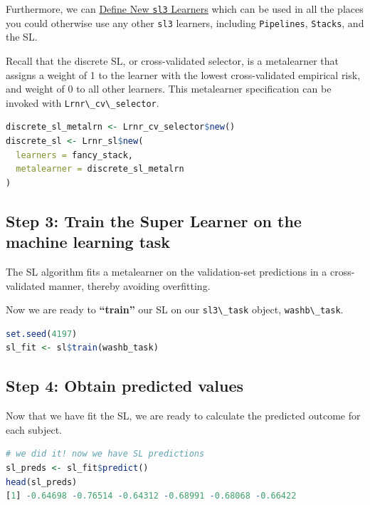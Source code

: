 \documentclass[12pt, krantz2,]{krantz}
\newcommand{\passthrough}[1]{#1}
\theoremstyle{definition}
\theoremstyle{definition}
\theoremstyle{definition}
\newcommand{\1}{\mathbbm{1}}
\begin{document}
Furthermore, we can \href{https://tlverse.org/sl3/articles/custom_lrnrs.html}{Define New \passthrough{\lstinline!sl3!}
Learners} which can be used
in all the places you could otherwise use any other \passthrough{\lstinline!sl3!} learners, including
\passthrough{\lstinline!Pipelines!}, \passthrough{\lstinline!Stacks!}, and the SL.

Recall that the discrete SL, or cross-validated selector, is a metalearner that
assigns a weight of 1 to the learner with the lowest cross-validated empirical
risk, and weight of 0 to all other learners. This metalearner specification can
be invoked with \passthrough{\lstinline!Lrnr\_cv\_selector!}.

\begin{lstlisting}[language=R]
discrete_sl_metalrn <- Lrnr_cv_selector$new()
discrete_sl <- Lrnr_sl$new(
  learners = fancy_stack,
  metalearner = discrete_sl_metalrn
)
\end{lstlisting}

\hypertarget{step-3-train-the-super-learner-on-the-machine-learning-task}{%
\subsection{Step 3: Train the Super Learner on the machine learning task}\label{step-3-train-the-super-learner-on-the-machine-learning-task}}

The SL algorithm fits a metalearner on the validation-set predictions in a
cross-validated manner, thereby avoiding overfitting.

Now we are ready to \textbf{``train''} our SL on our \passthrough{\lstinline!sl3\_task!} object, \passthrough{\lstinline!washb\_task!}.

\begin{lstlisting}[language=R]
set.seed(4197)
sl_fit <- sl$train(washb_task)
\end{lstlisting}

\hypertarget{step-4-obtain-predicted-values}{%
\subsection{Step 4: Obtain predicted values}\label{step-4-obtain-predicted-values}}

Now that we have fit the SL, we are ready to calculate the predicted outcome
for each subject.

\begin{lstlisting}[language=R]
# we did it! now we have SL predictions
sl_preds <- sl_fit$predict()
head(sl_preds)
[1] -0.64698 -0.76514 -0.64312 -0.68991 -0.68068 -0.66422
\end{lstlisting}
\end{document}

